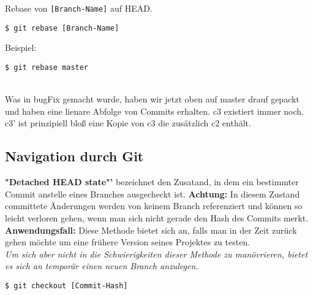 \documentclass[a4paper,8pt,landscape,twocolumn]{scrartcl}
\begin{document}
\begin{orangeBox}
Rebase von \texttt{[Branch-Name]} auf HEAD.
\begin{lstlisting}[style=bash]
$ git rebase [Branch-Name]
\end{lstlisting}
Beispiel:
\begin{lstlisting}[style=bash]
$ git rebase master
\end{lstlisting}

\\
Was in bugFix gemacht wurde, haben wir jetzt oben auf master drauf gepackt und haben eine lienare Abfolge von Commits erhalten. c3 existiert immer noch. c3' ist prinzipiell bloß eine Kopie von c3 die zusätzlich c2 enthält.
\end{orangeBox}


\subsection{Navigation durch Git}
\begin{orangeBox}
\textbf{"Detached HEAD state"'} bezeichnet den Zusatand, in dem ein bestimmter Commit anstelle eines Branches ausgecheckt ist. \textbf{Achtung:} In diesem Zustand committete Änderungen werden von keinem Branch referenziert und können so leicht verloren gehen, wenn man sich nicht gerade den Hash des Commits merkt. \textbf{Anwendungsfall:} Diese Methode bietet sich an, falls man in der Zeit zurück gehen möchte um eine frühere Version seines Projektes zu testen.\\
\textit{Um sich aber nicht in die Schwierigkeiten dieser Methode zu manövrieren, bietet es sich an temporär einen neuen Branch anzulegen.}
\begin{lstlisting}[style=bash]
$ git checkout [Commit-Hash]
\end{lstlisting}
\end{orangeBox}
\end{document}
